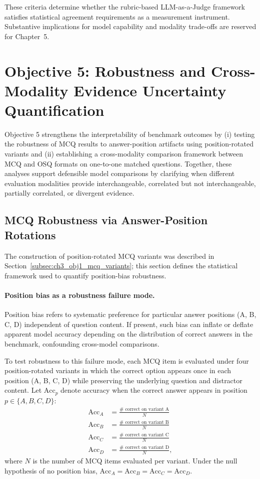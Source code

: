 These criteria determine whether the rubric-based LLM-as-a-Judge framework satisfies statistical agreement requirements as a measurement instrument. Substantive implications for model capability and modality trade-offs are reserved for Chapter~5.

\section{Objective 5: Robustness and Cross-Modality Evidence Uncertainty Quantification}
\label{sec:ch3_obj5}

Objective 5 strengthens the interpretability of benchmark outcomes by (i) testing the robustness of MCQ results to answer-position artifacts using position-rotated variants and (ii) establishing a cross-modality comparison framework between MCQ and OSQ formats on one-to-one matched questions. Together, these analyses support defensible model comparisons  by clarifying when different evaluation modalities provide interchangeable, correlated but not interchangeable, partially correlated, or divergent evidence.

\subsection{MCQ Robustness via Answer-Position Rotations}
\label{subsec:ch3_obj5_mcq_robustness}

The construction of position-rotated MCQ variants was described in Section~\ref{subsec:ch3_obj1_mcq_variants}; this section defines the statistical framework used to quantify position-bias robustness.


\paragraph{Position bias as a robustness failure mode.}
Position bias refers to systematic preference for particular answer positions (A, B, C, D) independent of question content. If present, such bias can inflate or deflate apparent model accuracy depending on the distribution of correct answers in the benchmark, confounding cross-model comparisons.

To test robustness to this failure mode, each MCQ item is evaluated under four position-rotated variants in which the correct option appears once in each position (A, B, C, D) while preserving the underlying question and distractor content. Let $\text{Acc}_p$ denote accuracy when the correct answer appears in position $p \in \{A,B,C,D\}$:
\begin{align}
\text{Acc}_A &= \frac{\#\text{ correct on variant A}}{N} \\
\text{Acc}_B &= \frac{\#\text{ correct on variant B}}{N} \\
\text{Acc}_C &= \frac{\#\text{ correct on variant C}}{N} \\
\text{Acc}_D &= \frac{\#\text{ correct on variant D}}{N},
\end{align}
where $N$ is the number of MCQ items evaluated per variant. Under the null hypothesis of no position bias, $\text{Acc}_A=\text{Acc}_B=\text{Acc}_C=\text{Acc}_D$.

